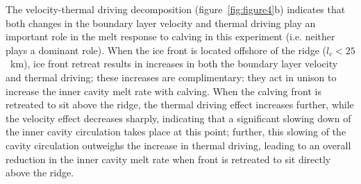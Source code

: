 \documentclass[draft]{agujournal2019}
\begin{document}
The velocity-thermal driving decomposition (figure~\ref{fig:figure4}b) indicates that both changes in the boundary layer velocity and thermal driving play an important role in the melt response to calving in this experiment (i.e. neither plays a dominant role).  When the ice front is located offshore of the ridge ($l_c < 25$~km), ice front retreat results in increases in both the boundary layer velocity and thermal driving; these increases are complimentary: they act in unison to increase the inner cavity melt rate with calving. When the calving front is retreated to sit above the ridge, the thermal driving effect increases further, while the velocity effect decreases sharply, indicating that a significant slowing down of the inner cavity circulation takes place at this point; further, this slowing of the cavity circulation outweighs the increase in thermal driving, leading to an overall reduction in the inner cavity melt rate when front is retreated to sit directly above the ridge. 
\end{document}
